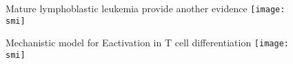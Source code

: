 \documentclass[10pt]{beamer}
\def\smi{out/ln/updir/mw-gcthesis-oral/library.bib}
\begin{document}
\begin{frame}{Mature lymphoblastic leukemia provide another evidence}
  \def\smi{out/ln/updir/mw-gcthesis-oral/ink/tall/H3K27ac_HOXA5-9_TLX1_TLX3_ealpha_barplot.png}
  \texttt{[image: \\smi]}%
\end{frame}
\begin{frame}{Mechanistic model for E\textalpha activation in T cell differentiation}
  \def\smi{out/ln/updir/mw-gcthesis-oral/ink/Highlight_HOXA_Blueprint_paper.pdf}
  \texttt{[image: \\smi]}%
\end{frame}
\end{document}
